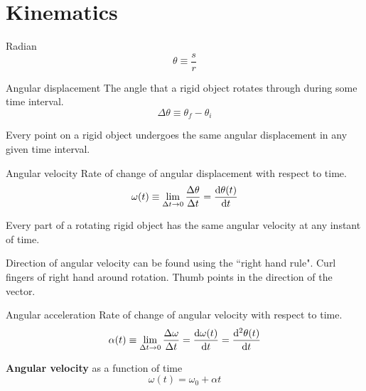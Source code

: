 \section{Kinematics}
\begin{defn}{Radian}{}
\begin{equation}
\theta \equiv \frac{s}{r}
\end{equation}
\end{defn}

\begin{defn}{Angular displacement}{}
The angle that a rigid object rotates through during some time interval.
\begin{equation}
\Delta \theta \equiv \theta_f - \theta_i
\end{equation}
\end{defn}

\begin{remark}
Every point on a rigid object undergoes the same angular displacement in any given time interval.
\end{remark}

\begin{defn}{Angular velocity}{}
Rate of change of angular displacement with respect to time.
\begin{equation}
\omega(t) \equiv \lim_{\Delta t \to 0} \frac{\Delta \theta}{\Delta t} = \dv{\theta (t)}{t}
\end{equation}
\end{defn}

\begin{remark}
Every part of a rotating rigid object has the same angular velocity at any instant of time.
\end{remark}

Direction of angular velocity can be found using the ``right hand rule". Curl fingers of right hand around rotation. Thumb points in the direction of the vector.

\begin{defn}{Angular acceleration}{}
Rate of change of angular velocity with respect to time.
\begin{equation}
\alpha (t) \equiv \lim_{\Delta t \to 0} \frac{\Delta \omega}{\Delta t} = \odv{\omega (t)}{t} = \odv{^2 \theta (t)}{t}
\end{equation}
\end{defn}

\textbf{Angular velocity} as a function of time 
\begin{equation}
\omega(t) = \omega_0 + \alpha t
\end{equation}

